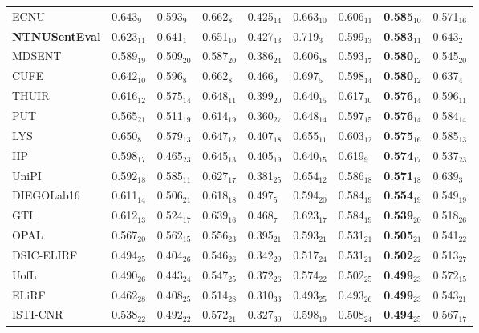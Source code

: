\begin{table}[H]
{\begin{tabular}{|l|ll|lll|l|l|l|}
ECNU & 0.643$_{9}$ & 0.593$_{9}$ & 0.662$_{8}$ & 0.425$_{14}$ & 0.663$_{10}$ & 0.606$_{11}$ & \bf 0.585$_{10}$ & 0.571$_{16}$ \\
\bf NTNUSentEval & 0.623$_{11}$ & 0.641$_{1}$ & 0.651$_{10}$ & 0.427$_{13}$ & 0.719$_{3}$ & 0.599$_{13}$ & \bf 0.583$_{11}$ & 0.643$_{2}$ \\
MDSENT & 0.589$_{19}$ & 0.509$_{20}$ & 0.587$_{20}$ & 0.386$_{24}$ & 0.606$_{18}$ & 0.593$_{17}$ & \bf 0.580$_{12}$ & 0.545$_{20}$ \\
CUFE & 0.642$_{10}$ & 0.596$_{8}$ & 0.662$_{8}$ & 0.466$_{9}$ & 0.697$_{5}$ & 0.598$_{14}$ & \bf 0.580$_{12}$ & 0.637$_{4}$ \\
THUIR & 0.616$_{12}$ & 0.575$_{14}$ & 0.648$_{11}$ & 0.399$_{20}$ & 0.640$_{15}$ & 0.617$_{10}$ & \bf 0.576$_{14}$ & 0.596$_{11}$ \\
PUT & 0.565$_{21}$ & 0.511$_{19}$ & 0.614$_{19}$ & 0.360$_{27}$ & 0.648$_{14}$ & 0.597$_{15}$ & \bf 0.576$_{14}$ & 0.584$_{14}$ \\
LYS & 0.650$_{8}$ & 0.579$_{13}$ & 0.647$_{12}$ & 0.407$_{18}$ & 0.655$_{11}$ & 0.603$_{12}$ & \bf 0.575$_{16}$ & 0.585$_{13}$ \\
IIP & 0.598$_{17}$ & 0.465$_{23}$ & 0.645$_{13}$ & 0.405$_{19}$ & 0.640$_{15}$ & 0.619$_{9}$ & \bf 0.574$_{17}$ & 0.537$_{23}$ \\
UniPI & 0.592$_{18}$ & 0.585$_{11}$ & 0.627$_{17}$ & 0.381$_{25}$ & 0.654$_{12}$ & 0.586$_{18}$ & \bf 0.571$_{18}$ & 0.639$_{3}$ \\
DIEGOLab16 & 0.611$_{14}$ & 0.506$_{21}$ & 0.618$_{18}$ & 0.497$_{5}$ & 0.594$_{20}$ & 0.584$_{19}$ & \bf 0.554$_{19}$ & 0.549$_{19}$ \\
GTI & 0.612$_{13}$ & 0.524$_{17}$ & 0.639$_{16}$ & 0.468$_{7}$ & 0.623$_{17}$ & 0.584$_{19}$ & \bf 0.539$_{20}$ & 0.518$_{26}$ \\
OPAL & 0.567$_{20}$ & 0.562$_{15}$ & 0.556$_{23}$ & 0.395$_{21}$ & 0.593$_{21}$ & 0.531$_{21}$ & \bf 0.505$_{21}$ & 0.541$_{22}$ \\
DSIC-ELIRF & 0.494$_{25}$ & 0.404$_{26}$ & 0.546$_{26}$ & 0.342$_{29}$ & 0.517$_{24}$ & 0.531$_{21}$ & \bf 0.502$_{22}$ & 0.513$_{27}$ \\
UofL & 0.490$_{26}$ & 0.443$_{24}$ & 0.547$_{25}$ & 0.372$_{26}$ & 0.574$_{22}$ & 0.502$_{25}$ & \bf 0.499$_{23}$ & 0.572$_{15}$ \\
ELiRF & 0.462$_{28}$ & 0.408$_{25}$ & 0.514$_{28}$ & 0.310$_{33}$ & 0.493$_{25}$ & 0.493$_{26}$ & \bf 0.499$_{23}$ & 0.543$_{21}$ \\
ISTI-CNR & 0.538$_{22}$ & 0.492$_{22}$ & 0.572$_{21}$ & 0.327$_{30}$ & 0.598$_{19}$ & 0.508$_{24}$ & \bf 0.494$_{25}$ & 0.567$_{17}$ \\

\end{tabular}}
\end{table}
